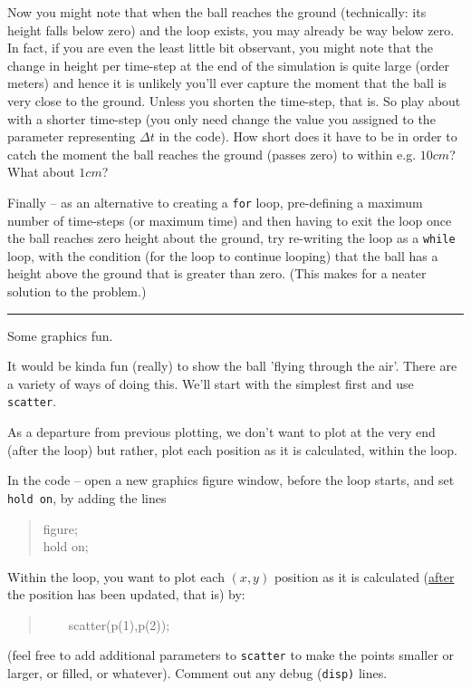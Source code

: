 \documentclass{tufte-book} %
\newenvironment{docspec}{\begin{quotation}\ttfamily\parskip0pt\parindent0pt\ignorespaces}{\end{quotation}}
\begin{document}
Now you might note that when the ball reaches the ground (technically: its height falls below zero) and the loop exists, you may already be way below zero. In fact, if you are even the least little bit observant, you might note that the change in height per time-step at the end of the simulation is quite large (order meters) and hence it is unlikely you'll ever capture the moment that the ball is very close to the ground. Unless you shorten the time-step, that is. So play about with a shorter time-step (you only need change the value you assigned to the parameter representing \(\Delta t\) in the code). How short does it have to be in order to catch the moment the ball reaches the ground (passes zero) to within e.g. \(10 cm\)? What about \(1 cm\)?

Finally -- as an alternative to creating a \texttt{for} loop, pre-defining a maximum number of time-steps (or maximum time) and then  having to exit the loop once the ball reaches zero height about the ground, try re-writing the loop as a \texttt{while} loop, with the condition (for the loop to continue looping) that the ball has a height above the ground that is greater than zero. (This makes for a neater solution to the problem.)

\vspace{1mm}
\noindent\rule{4cm}{0.5pt}
\vspace{-2mm}

 Some graphics fun.

It would be kinda fun (really) to show the ball 'flying through the air'. There are a variety of ways of doing this. We'll start with the simplest first and use \texttt{scatter}.

As a departure from previous plotting, we don't want to plot at the very end (after the loop) but rather, plot each position as it is calculated, within the loop.

In the code -- open a new graphics figure window, before the loop starts, and set \texttt{hold on}, by adding the lines
\begin{docspec}
figure;
\\hold on;
\end{docspec}

Within the loop, you want to plot each \((x,y)\) position as it is calculated (\uline{after} the position has been updated, that is) by:
\begin{docspec}
\ \ \ \ scatter(p(1),p(2));
\end{docspec}
(feel free to add additional parameters to \texttt{scatter} to make the points smaller or larger, or filled, or whatever). Comment out any debug (\texttt{disp)} lines.
\end{document}
